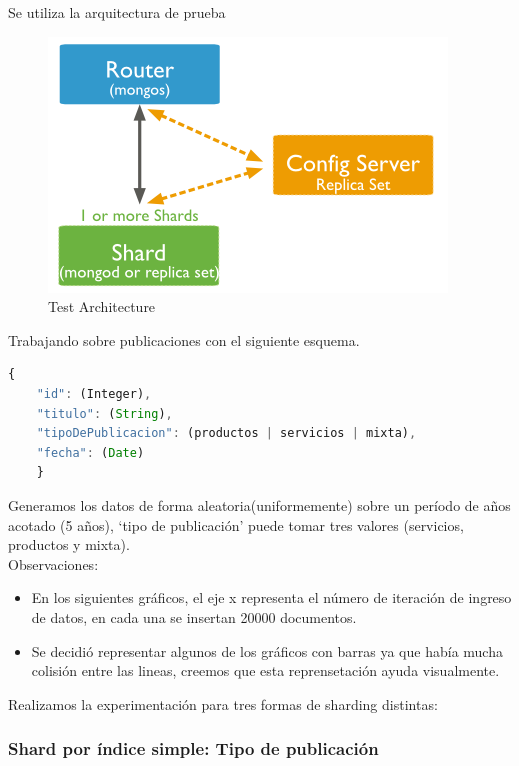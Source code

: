 Se utiliza la arquitectura de prueba
\begin{figure}[h!]
 \centering
 \includegraphics[scale=0.5,keepaspectratio=true]{./sharded-cluster-test-architecture.png}
 \caption{Test Architecture}
\end{figure}

Trabajando sobre publicaciones con el siguiente esquema.

\begin{lstlisting}[language=JavaScript]
	{
	"id": (Integer),
	"titulo": (String),
	"tipoDePublicacion": (productos | servicios | mixta),
	"fecha": (Date)
	}
\end{lstlisting}

Generamos los datos de forma aleatoria(uniformemente) sobre un período de años acotado (5 años), `tipo de publicación' puede tomar tres valores
(servicios, productos y mixta).\\

Observaciones:
\begin{itemize}
\item En los siguientes gráficos, el eje x representa el número de iteración de ingreso de datos, en cada una se insertan 20000 documentos.
\item Se decidió representar algunos de los gráficos con barras ya que había mucha colisión entre las lineas, creemos que esta reprensetación ayuda visualmente.
\end{itemize}


Realizamos la experimentación para tres formas de sharding distintas:

\subsubsection{Shard por índice simple: Tipo de publicación}


